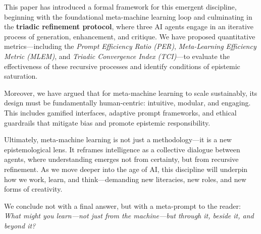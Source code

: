 \documentclass{article}
\begin{document}
This paper has introduced a formal framework for this emergent discipline, beginning with the foundational meta-machine learning loop and culminating in the \textbf{triadic refinement protocol}, where three AI agents engage in an iterative process of generation, enhancement, and critique. We have proposed quantitative metrics—including the \textit{Prompt Efficiency Ratio (PER)}, \textit{Meta-Learning Efficiency Metric (MLEM)}, and \textit{Triadic Convergence Index (TCI)}—to evaluate the effectiveness of these recursive processes and identify conditions of epistemic saturation.

Moreover, we have argued that for meta-machine learning to scale sustainably, its design must be fundamentally human-centric: intuitive, modular, and engaging. This includes gamified interfaces, adaptive prompt frameworks, and ethical guardrails that mitigate bias and promote epistemic responsibility.

Ultimately, meta-machine learning is not just a methodology—it is a new epistemological lens. It reframes intelligence as a collective dialogue between agents, where understanding emerges not from certainty, but from recursive refinement. As we move deeper into the age of AI, this discipline will underpin how we work, learn, and think—demanding new literacies, new roles, and new forms of creativity.

We conclude not with a final answer, but with a meta-prompt to the reader: \emph{What might you learn—not just from the machine—but through it, beside it, and beyond it?}
\end{document}
